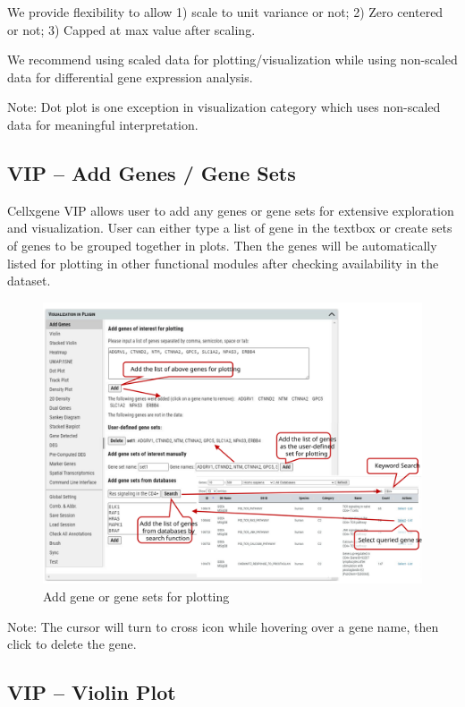 \documentclass[
]{article}
\begin{document}
We provide flexibility to allow 1) scale to unit variance or not; 2) Zero centered or not; 3) Capped at max value after scaling.

We recommend using scaled data for plotting/visualization while using non-scaled data for differential gene expression analysis.

Note: Dot plot is one exception in visualization category which uses non-scaled data for meaningful interpretation.

\hypertarget{vip-add-genes-gene-sets}{%
\subsection{VIP -- Add Genes / Gene Sets}\label{vip-add-genes-gene-sets}}

Cellxgene VIP allows user to add any genes or gene sets for extensive exploration and visualization. User can either type a list of gene in the textbox or create sets of genes to be grouped together in plots. Then the genes will be automatically listed for plotting in other functional modules after checking availability in the dataset.

\begin{figure}
\centering
\includegraphics{figures/F6_label.svg}
\caption{Add gene or gene sets for plotting}
\end{figure}

Note: The cursor will turn to cross icon while hovering over a gene name, then click to delete the gene.

\hypertarget{vip-violin-plot}{%
\subsection{VIP -- Violin Plot}\label{vip-violin-plot}}
\end{document}
